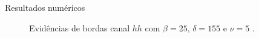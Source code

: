 \documentclass[10pt]{beamer}
\begin{document}
\begin{frame}{Resultados numéricos}
\begin{figure}[hbt]
	\caption{Evidências de bordas canal $hh$ com $\beta = 25$, $\delta = 155$ e $\nu = 5$ .}
\label{cap_acf_fig16}
\endminipage\hfill
\end{figure}
\end{frame}
\end{document}
